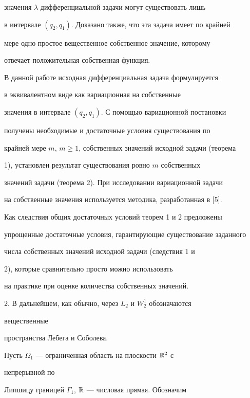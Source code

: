 значения $\lambda$ дифференциальной задачи могут существовать лишь 


в интервале $(q_2,q_1)$. Доказано также, что эта задача имеет по крайней 


мере одно простое вещественное собственное значение, которому 


отвечает положительная собственная функция. 


 


В данной работе исходная дифференциальная задача формулируется 


в эквивалентном виде как вариационная на собственные 


значения в интервале $(q_2,q_1)$. С помощью вариационной постановки 


получены необходимые и достаточные условия существования по 


крайней мере $m$, $m\ge1$, собственных значений исходной задачи (теорема 


1), установлен результат существования ровно $m$ собственных 


значений задачи (теорема 2). При исследовании вариационной задачи 


на собственные значения используется методика, разработанная в [5]. 


Как следствия общих достаточных условий теорем 1 и 2 предложены 


упрощенные достаточные условия, гарантирующие существование заданного 


числа собственных значений исходной задачи (следствия 1 и 


2), которые сравнительно просто можно использовать 


на практике при оценке количества собственных значений. 


\medskip 


 


2. В дальнейшем, как обычно, через $L_2$ и $W^1_2$ обозначаются 


вещественные 


пространства Лебега и Соболева. 


 


Пусть $\Omega_1$ --- ограниченная область на плоскости $\Bbb R^2$ с 


непрерывной по 


Липшицу границей $\Gamma_1$, $\Bbb R$ --- числовая прямая. Обозначим 


